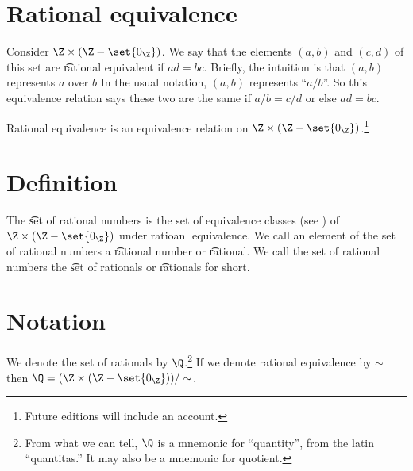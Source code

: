 

\section*{Rational equivalence}

Consider $\Z  \times  (\Z  - \set{0_{\Z }})$.
We say that the elements $(a, b)$ and $(c, d)$ of this set are \t{rational equivalent} if $ad = bc$.
Brieﬂy, the intuition is that $(a, b)$ represents $a$ over $b$
In the usual notation, $(a, b)$ represents ``$a/b$''.
So this equivalence relation says these two are the same if $a/b = c/d$ or else $ad= bc$.

\begin{proposition}
Rational equivalence is an equivalence relation on $\Z \times (\Z  - \set{0_{\Z }})$.\footnote{Future editions will include an account.}

\end{proposition}

\section*{Definition}

The \t{set of rational numbers} is the set of equivalence classes (see ) of $\Z  \times (\Z  - \set{0_{\Z }})$ under ratioanl equivalence.
We call an element of the set of rational numbers a \t{rational number} or \t{rational}.
We call the set of rational numbers the \t{set of rationals} or \t{rationals} for short.

\section*{Notation}

We denote the set of rationals by $\Q $.\footnote{From what we can tell, $\Q $ is a mnemonic for ``quantity'', from the latin ``quantitas.''
It may also be a mnemonic for quotient.}
If we denote rational equivalence by $\sim$ then $\Q  = (\Z \times (\Z  - \set{0_{\Z }}))/\sim$.

\blankpage